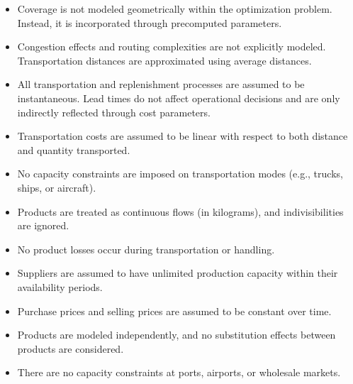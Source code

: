 \documentclass[12pt]{article}
\begin{document}
\begin{itemize}
    \item Coverage is not modeled geometrically within the optimization problem. Instead, it is incorporated through precomputed parameters.
    
    \item Congestion effects and routing complexities are not explicitly modeled. Transportation distances are approximated using average distances.
    
    
    
    \item All transportation and replenishment processes are assumed to be instantaneous. Lead times do not affect operational decisions and are only indirectly reflected through cost parameters.
    
    \item Transportation costs are assumed to be linear with respect to both distance and quantity transported.
    
    \item No capacity constraints are imposed on transportation modes (e.g., trucks, ships, or aircraft).
    
    \item Products are treated as continuous flows (in kilograms), and indivisibilities are ignored.
    
    \item No product losses occur during transportation or handling.
    
    
    
    \item Suppliers are assumed to have unlimited production capacity within their availability periods.
    
    \item Purchase prices and selling prices are assumed to be constant over time.
    
    \item Products are modeled independently, and no substitution effects between products are considered.
    
    \item There are no capacity constraints at ports, airports, or wholesale markets.
    
    
    

\end{itemize}
\end{document}
